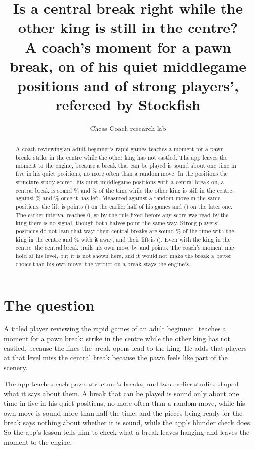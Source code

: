\documentclass[11pt]{article}
\title{Is a central break right while the other king is still in the centre?\\[0.3em]
\large A coach's moment for a pawn break, on \Entering{} of his quiet middlegame positions and
\StrongEntering{} of strong players', refereed by Stockfish}
\author{Chess Coach research lab}
\date{}
\begin{document}
\maketitle

\begin{abstract}
A coach reviewing an adult beginner's rapid games teaches a moment for a pawn break: strike in the
centre while the other king has not castled. The app leaves the moment to the engine, because a
break that can be played is sound about one time in five in his quiet positions, no more often
than a random move. In the positions the structure study scored, his quiet middlegame positions
with a central break on, a central break is sound \CCentreFirst\% and \CCentreSecond\% of the time
while the other king is still in the centre, against \CAwayFirst\% and \CAwaySecond\% once it has
left. Measured against a random move in the same positions, the lift is \LiftFirst{} points
(\LiftFirstCi) on the earlier half of his games and \LiftSecond{} (\LiftSecondCi) on the later
one. The earlier interval reaches 0, so by the rule fixed before any score was read by the king
there is no signal, though both halves point the same way. Strong players' positions do not lean
that way: their central breaks are sound \StrongCCentre\% of the time with the king in the centre
and \StrongCAway\% with it away, and their lift is \StrongLift{} (\StrongLiftCi). Even with the king
in the centre, the central break trails his own move by \GainFirst{} and \GainSecond{} points. The
coach's moment may hold at his level, but it is not shown here, and it would not make the break a
better choice than his own move: the verdict on a break stays the engine's.
\end{abstract}

\section{The question}

A titled player reviewing the rapid games of an adult beginner~\cite{video} teaches a moment for a pawn break: strike in the centre while the other king has not castled,
because the lines the break opens lead to the king. He adds that players at that level miss the
central break because the pawn feels like part of the scenery.

The app teaches each pawn structure's breaks, and two earlier studies shaped what it says about
them. A break that can be played is sound only about one time in five in his quiet positions, no
more often than a random move, while his own move is sound more than half the time; and the
pieces being ready for the break says nothing about whether it is sound, while the app's blunder
check does. So the app's lesson tells him to check what a break leaves hanging and leaves the
moment to the engine.
\end{document}
